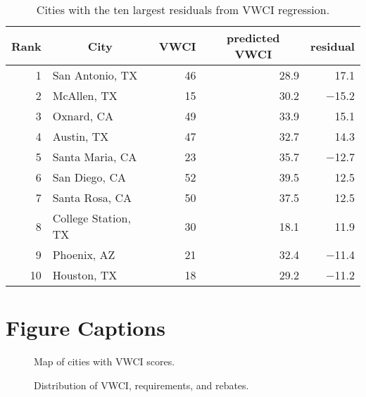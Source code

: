 \documentclass[draft,linenumbers]{agujournal}\usepackage{knitr}
\begin{document}
\begin{table}[htbp]
\centering
\caption{Cities with the ten largest residuals from VWCI regression.} 
\label{tab:vwci_top_residuals}
\begin{tabular}{rlrrr}
  \hline
\multicolumn{1}{c}{ Rank } & \multicolumn{1}{c}{ City } & \multicolumn{1}{c}{ VWCI } & \multicolumn{1}{c}{ predicted VWCI } & \multicolumn{1}{c}{ residual } \\ 
  \hline
 1 & San Antonio, TX & 46 & 28.9 & 17.1 \\ 
   2 & McAllen, TX & 15 & 30.2 & $-$15.2 \\ 
   3 & Oxnard, CA & 49 & 33.9 & 15.1 \\ 
   4 & Austin, TX & 47 & 32.7 & 14.3 \\ 
   5 & Santa Maria, CA & 23 & 35.7 & $-$12.7 \\ 
   6 & San Diego, CA & 52 & 39.5 & 12.5 \\ 
   7 & Santa Rosa, CA & 50 & 37.5 & 12.5 \\ 
   8 & College Station, TX & 30 & 18.1 & 11.9 \\ 
   9 & Phoenix, AZ & 21 & 32.4 & $-$11.4 \\ 
  10 & Houston, TX & 18 & 29.2 & $-$11.2 \\ 
   \hline
\end{tabular}
\end{table}


%
%
\clearpage
\section*{Figure Captions}

\begin{figure}[h]
\caption{Map of cities with VWCI scores.}\label{fig:vwci_map}
\end{figure}


\begin{figure}[h]
\caption{Distribution of VWCI, requirements, and rebates.}\label{fig:vwci_histogram}
\end{figure}
\end{document}

